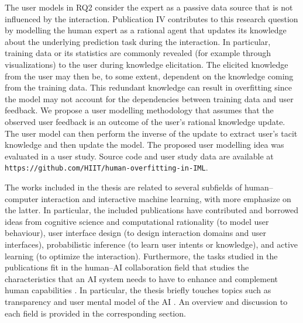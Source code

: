 \documentclass[dissertation,math,vertlayout,pdfa,colorlinks]{aaltoseries}
\begin{document}
The user models in RQ2 consider the expert as a passive data source that is not influenced by the interaction. Publication IV contributes to this research question by modelling the human expert as a rational agent that updates its knowledge about the underlying prediction task during the interaction. In particular, training data or its statistics are commonly revealed (for example through visualizations) to the user during knowledge elicitation. The elicited knowledge from the user may then be, to some extent, dependent on the knowledge coming from the training data. This redundant knowledge can  result in overfitting since the model may not account for the dependencies between training data and user feedback. We propose a user modelling methodology that assumes that the observed user feedback is an outcome of the user's rational knowledge update. The user model can then perform the inverse of the update to extract user's tacit knowledge and then update the model. The proposed user modelling idea was evaluated in a user study. 
Source code and user study data are available at \texttt{https://github.com/HIIT/human-overfitting-in-IML}.



The works included in the thesis are related to several subfields of human--computer interaction and interactive machine learning, with more emphasize on the latter. In particular, the included publications have contributed and borrowed ideas from cognitive science and computational rationality (to model user behaviour), user interface design (to design interaction domains and user interfaces), probabilistic inference (to learn user intents or knowledge), and active learning (to optimize the interaction). 
Furthermore, the tasks studied in the publications fit in the human--AI collaboration field that studies the characteristics that an AI system needs to have to enhance and complement human capabilities \cite{Human_AI_Teams_2019,chi2019_guideline}. In particular, the thesis briefly touches topics such as transparency and user mental model of the AI \cite{mental_human_ai_2019}. An overview and discussion to each field is provided in the corresponding section.
\end{document}
